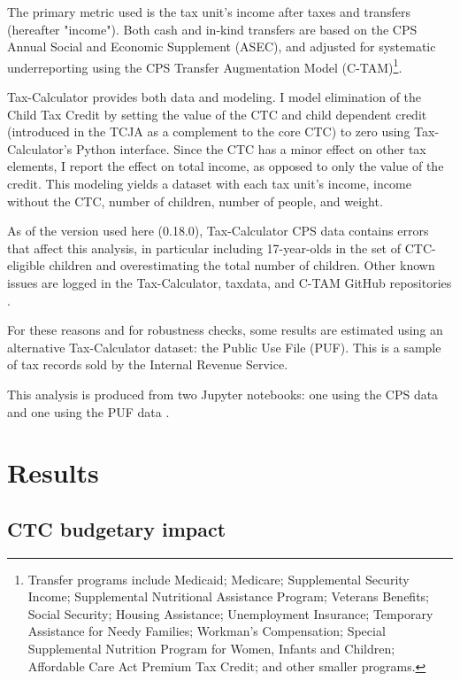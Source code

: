\documentclass[12pt]{article}
\begin{document}
The primary metric used is the tax unit's income after taxes and transfers (hereafter "income"). Both cash and in-kind transfers are based on the CPS Annual Social and Economic Supplement (ASEC), and adjusted for systematic underreporting using the CPS Transfer Augmentation Model (C-TAM)\footnote{Transfer programs include Medicaid; Medicare; Supplemental Security Income; Supplemental Nutritional Assistance Program; Veterans Benefits; Social Security; Housing Assistance; Unemployment Insurance; Temporary Assistance for Needy Families; Workman's Compensation; Special Supplemental Nutrition Program for Women, Infants and Children; Affordable Care Act Premium Tax Credit; and other smaller programs.}.

Tax-Calculator provides both data and modeling. I model elimination of the Child Tax Credit by setting the value of the CTC and child dependent credit (introduced in the TCJA as a complement to the core CTC) to zero using Tax-Calculator's Python interface. Since the CTC has a minor effect on other tax elements, I report the effect on total income, as opposed to only the value of the credit. This modeling yields a dataset with each tax unit's income, income without the CTC, number of children, number of people, and weight.

As of the version used here (0.18.0), Tax-Calculator CPS data contains errors that affect this analysis, in particular including 17-year-olds in the set of CTC-eligible children and overestimating the total number of children. Other known issues are logged in the Tax-Calculator, taxdata, and C-TAM GitHub repositories \cite{open_source_economics}.

For these reasons and for robustness checks, some results are estimated using an alternative Tax-Calculator dataset: the Public Use File (PUF). This is a sample of tax records sold by the Internal Revenue Service.

This analysis is produced from two Jupyter \cite{Kluyver:2016aa} notebooks: one using the CPS data \cite{ghenis_notebook} and one using the PUF data \cite{ghenis_puf_notebook}.

\section{Results} \label{sec:result}

\subsection{CTC budgetary impact}
\end{document}
